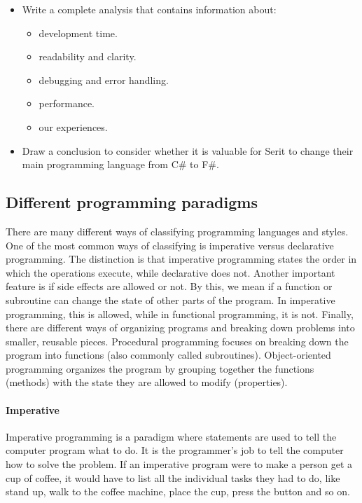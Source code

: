 \documentclass[12pt, a4paper]{article}
\begin{document}
\begin{itemize}
	\item Write a complete analysis that contains information about:
	\begin{itemize}
		\item development time.
		\item readability and clarity.
		\item debugging and error handling.
		\item performance.
		\item our experiences.
	\end{itemize}
	
	\item Draw a conclusion to consider whether it is valuable for Serit to change their main programming language from C\# to F\#.
	
\end{itemize}


\newpage

\subsection{Different programming paradigms}
There are many different ways of classifying programming languages and styles. One of the most common ways of classifying is imperative versus declarative programming. The distinction is that imperative programming states the order in which the operations execute, while declarative does not. Another important feature is if side effects are allowed or not. By this, we mean if a function or subroutine can change the state of other parts of the program. In imperative programming, this is allowed, while in functional programming, it is not. Finally, there are different ways of organizing programs and breaking down problems into smaller, reusable pieces. Procedural programming focuses on breaking down the program into functions (also commonly called subroutines). Object-oriented programming organizes the program by grouping together the functions (methods) with the state they are allowed to modify (properties).

\paragraph{Imperative} Imperative programming is a paradigm where statements are used to tell the computer program what to do. It is the programmer’s job to tell the computer how to solve the problem. If an imperative program were to make a person get a cup of coffee, it would have to list all the individual tasks they had to do, like stand up, walk to the coffee machine, place the cup, press the button and so on. 
\end{document}
